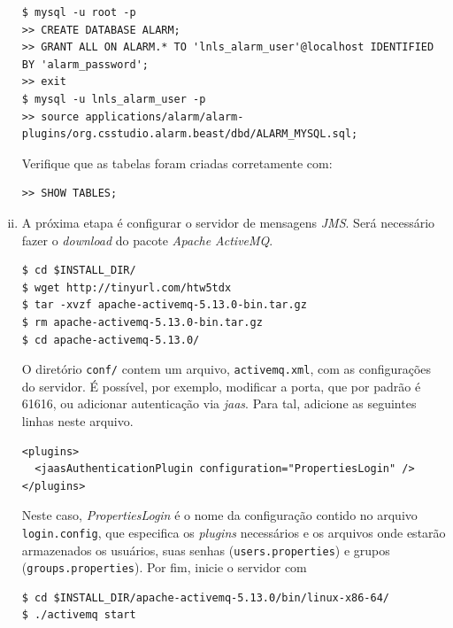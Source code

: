 \begin{enumerate}[i.]
\begin{lstlisting}[basicstyle=\fontsize{9}{13}\selectfont\ttfamily,
keywordstyle=\ttfamily, style=nonumbers] $ mysql -u root -p
>> CREATE DATABASE ALARM;
>> GRANT ALL ON ALARM.* TO 'lnls_alarm_user'@localhost IDENTIFIED BY 'alarm_password';
>> exit
$ mysql -u lnls_alarm_user -p
>> source applications/alarm/alarm-plugins/org.csstudio.alarm.beast/dbd/ALARM_MYSQL.sql;
\end{lstlisting}

Verifique que as tabelas foram criadas corretamente com:

\begin{lstlisting}[keywordstyle=\ttfamily, style=nonumbers]
>> SHOW TABLES;
\end{lstlisting}
   
\item A próxima etapa é configurar o servidor de mensagens \textit{JMS}. Será
necessário fazer o \textit{download} do pacote \textit{Apache ActiveMQ}.

\begin{lstlisting}[keywordstyle=\ttfamily, style=nonumbers]
$ cd $INSTALL_DIR/
$ wget http://tinyurl.com/htw5tdx
$ tar -xvzf apache-activemq-5.13.0-bin.tar.gz
$ rm apache-activemq-5.13.0-bin.tar.gz
$ cd apache-activemq-5.13.0/
\end{lstlisting}

O diretório \texttt{conf/} contem um arquivo, \texttt{activemq.xml}, com as
configurações do servidor. É possível, por exemplo, modificar a porta, que por
padrão é 61616, ou adicionar autenticação via \textit{jaas}. Para tal, adicione
as seguintes linhas neste arquivo.

\begin{lstlisting}[keywordstyle=\ttfamily, style=nonumbers]
<plugins>
  <jaasAuthenticationPlugin configuration="PropertiesLogin" />
</plugins>
\end{lstlisting}

Neste caso, \textit{PropertiesLogin} é o nome da configuração contido no arquivo
\texttt{login.config}, que especifica os \textit{plugins} necessários e os
arquivos onde estarão armazenados os usuários, suas senhas (\texttt{users.properties}) e grupos
(\texttt{groups.properties}). Por fim, inicie o servidor com 

\begin{lstlisting}[keywordstyle=\ttfamily, style=nonumbers]
$ cd $INSTALL_DIR/apache-activemq-5.13.0/bin/linux-x86-64/
$ ./activemq start
\end{lstlisting}


\end{enumerate}
